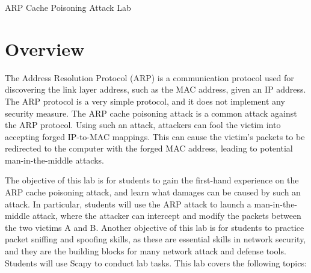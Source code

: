 
\newcommand{\commonfolder}{../../common-files}





\newcommand{\arpFigs}{./Figs}






\begin{center}
{\LARGE ARP Cache Poisoning Attack Lab}
\end{center}




\section{Overview}


The Address Resolution Protocol (ARP) is a communication protocol used for discovering the link
layer address, such as the MAC address, given an IP address. The ARP protocol is a very simple
protocol, and it does not implement any security measure. 
The ARP cache poisoning attack is a common attack against the ARP protocol. 
Using such an attack, attackers can fool the victim into accepting
forged IP-to-MAC mappings. This can cause the victim's packets to be 
redirected to the computer with the forged MAC address, leading to
potential man-in-the-middle attacks.


The objective of this lab is for students to gain the first-hand experience on the ARP cache
poisoning attack, and learn what damages can be caused by such an attack.
In particular, students will use the ARP attack to launch a man-in-the-middle attack,  
where the attacker can intercept and modify the packets between the two victims A and B. 
Another objective of this lab is for students to practice 
packet sniffing and spoofing skills, as these are 
essential skills in network security, and they are the building blocks
for many network attack and defense tools. 
Students will use Scapy to conduct lab tasks. 
This lab covers the following topics:


